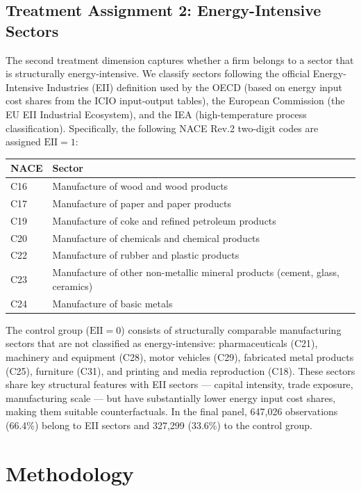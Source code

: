 \documentclass[12pt,a4paper]{article}
\begin{document}
\subsection{Treatment Assignment 2: Energy-Intensive Sectors}

The second treatment dimension captures whether a firm belongs to a sector that is structurally energy-intensive. We classify sectors following the official Energy-Intensive Industries (EII) definition used by the OECD (based on energy input cost shares from the ICIO input-output tables), the European Commission (the EU EII Industrial Ecosystem), and the IEA (high-temperature process classification). Specifically, the following NACE Rev.2 two-digit codes are assigned $\text{EII}=1$:

\begin{center}
\small
\begin{tabular}{ll}
\toprule
NACE & Sector \\
\midrule
C16 & Manufacture of wood and wood products \\
C17 & Manufacture of paper and paper products \\
C19 & Manufacture of coke and refined petroleum products \\
C20 & Manufacture of chemicals and chemical products \\
C22 & Manufacture of rubber and plastic products \\
C23 & Manufacture of other non-metallic mineral products (cement, glass, ceramics) \\
C24 & Manufacture of basic metals \\
\bottomrule
\end{tabular}
\end{center}

The control group ($\text{EII}=0$) consists of structurally comparable manufacturing sectors that are not classified as energy-intensive: pharmaceuticals (C21), machinery and equipment (C28), motor vehicles (C29), fabricated metal products (C25), furniture (C31), and printing and media reproduction (C18). These sectors share key structural features with EII sectors — capital intensity, trade exposure, manufacturing scale — but have substantially lower energy input cost shares, making them suitable counterfactuals. In the final panel, 647,026 observations (66.4\%) belong to EII sectors and 327,299 (33.6\%) to the control group.

\section{Methodology}
\label{sec:method}
\end{document}
